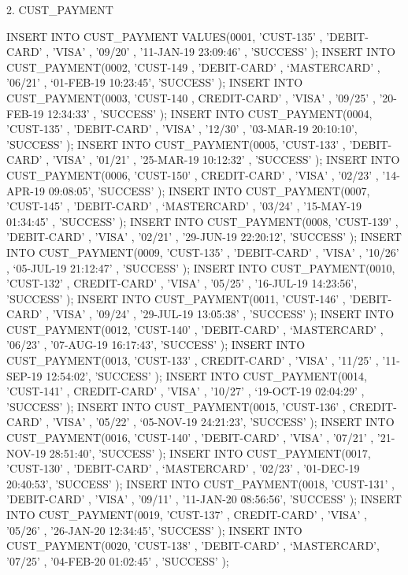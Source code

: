 2.	CUST_PAYMENT

INSERT INTO CUST_PAYMENT VALUES(0001, 'CUST-135' , 'DEBIT-CARD' , 'VISA' , '09/20' , '11-JAN-19 23:09:46’ , 'SUCCESS' ); 
INSERT INTO CUST_PAYMENT(0002, 'CUST-149 , 'DEBIT-CARD' , ‘MASTERCARD’ , '06/21' , ‘01-FEB-19 10:23:45’, 'SUCCESS' ); 
INSERT INTO CUST_PAYMENT(0003, 'CUST-140 , CREDIT-CARD' , 'VISA' , '09/25' , '20-FEB-19 12:34:33' , 'SUCCESS' ); 
INSERT INTO CUST_PAYMENT(0004, 'CUST-135' , 'DEBIT-CARD' , 'VISA' , '12/30' , '03-MAR-19 20:10:10', 'SUCCESS' ); 
INSERT INTO CUST_PAYMENT(0005, 'CUST-133' , 'DEBIT-CARD' , 'VISA' , '01/21' , '25-MAR-19 10:12:32' , 'SUCCESS' ); 
INSERT INTO CUST_PAYMENT(0006, 'CUST-150' , CREDIT-CARD' , 'VISA' , '02/23' , '14-APR-19 09:08:05', 'SUCCESS' ); 
INSERT INTO CUST_PAYMENT(0007, 'CUST-145' , 'DEBIT-CARD' , ‘MASTERCARD’ , '03/24' , '15-MAY-19 01:34:45' , 'SUCCESS' ); 
INSERT INTO CUST_PAYMENT(0008, 'CUST-139' , 'DEBIT-CARD' , 'VISA' , '02/21' , '29-JUN-19 22:20:12', 'SUCCESS' ); 
INSERT INTO CUST_PAYMENT(0009, 'CUST-135' , 'DEBIT-CARD' , 'VISA' , '10/26' , ‘05-JUL-19 21:12:47' , 'SUCCESS' ); 
INSERT INTO CUST_PAYMENT(0010, 'CUST-132' , CREDIT-CARD' , 'VISA' , '05/25' , '16-JUL-19 14:23:56', 'SUCCESS' ); 
INSERT INTO CUST_PAYMENT(0011, 'CUST-146' , 'DEBIT-CARD' , 'VISA' , '09/24' , '29-JUL-19 13:05:38' , 'SUCCESS' ); 
INSERT INTO CUST_PAYMENT(0012, 'CUST-140' , 'DEBIT-CARD' , ‘MASTERCARD’ , '06/23' , '07-AUG-19 16:17:43', 'SUCCESS' ); 
INSERT INTO CUST_PAYMENT(0013, 'CUST-133' , CREDIT-CARD' , 'VISA' , '11/25' , '11-SEP-19 12:54:02', 'SUCCESS' ); 
INSERT INTO CUST_PAYMENT(0014, 'CUST-141' , CREDIT-CARD' , 'VISA' , '10/27' , ‘19-OCT-19 02:04:29' , 'SUCCESS' ); 
INSERT INTO CUST_PAYMENT(0015, 'CUST-136' , CREDIT-CARD' , 'VISA' , '05/22' , ‘05-NOV-19 24:21:23', 'SUCCESS' ); 
INSERT INTO CUST_PAYMENT(0016, 'CUST-140' , 'DEBIT-CARD' , 'VISA' , '07/21' , '21-NOV-19 28:51:40', 'SUCCESS' ); 
INSERT INTO CUST_PAYMENT(0017, 'CUST-130' , 'DEBIT-CARD' , ‘MASTERCARD’ , '02/23' , '01-DEC-19 20:40:53', 'SUCCESS' ); 
INSERT INTO CUST_PAYMENT(0018, 'CUST-131' , 'DEBIT-CARD' , 'VISA' , '09/11' , '11-JAN-20 08:56:56', 'SUCCESS' ); 
INSERT INTO CUST_PAYMENT(0019, 'CUST-137' , CREDIT-CARD' , 'VISA' , '05/26' , '26-JAN-20 12:34:45', 'SUCCESS' ); 
INSERT INTO CUST_PAYMENT(0020, 'CUST-138' , 'DEBIT-CARD' , ‘MASTERCARD’, '07/25' , '04-FEB-20 01:02:45' , 'SUCCESS' );


